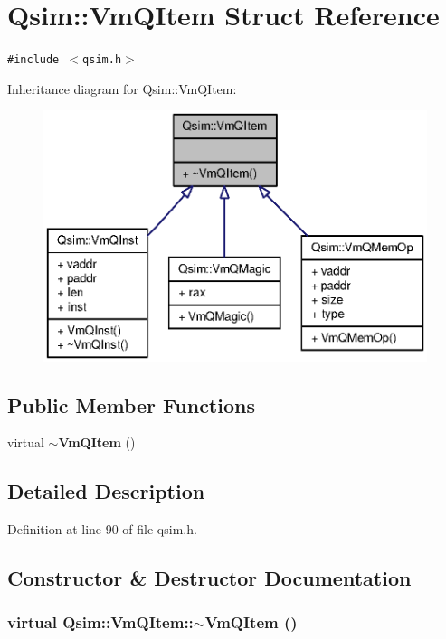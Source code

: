 \section{Qsim::VmQItem Struct Reference}
\label{structQsim_1_1VmQItem}
{\tt \#include $<$qsim.h$>$}

Inheritance diagram for Qsim::VmQItem:\nopagebreak
\begin{figure}[H]
\begin{center}
\leavevmode
\includegraphics[width=360pt]{structQsim_1_1VmQItem__inherit__graph}
\end{center}
\end{figure}
\subsection*{Public Member Functions}
\begin{CompactItemize}
\item 
virtual {\bf $\sim$VmQItem} ()
\end{CompactItemize}


\subsection{Detailed Description}


Definition at line 90 of file qsim.h.

\subsection{Constructor \& Destructor Documentation}
\subsubsection[{$\sim$VmQItem}]{\setlength{\rightskip}{0pt plus 5cm}virtual Qsim::VmQItem::$\sim$VmQItem ()\hspace{0.3cm}{\tt  [inline, virtual]}}\label{structQsim_1_1VmQItem_8a88fbb4e7fdff1866eb67a373d0d43e}




